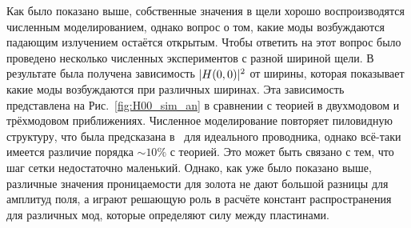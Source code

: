 Как было показано выше, собственные значения в щели хорошо воспроизводятся численным моделированием, однако вопрос о том, какие моды возбуждаются падающим излучением остаётся открытым. 
Чтобы ответить на этот вопрос было проведено несколько численных экспериментов с разной шириной щели. В результате была получена зависимость $\lvert H(0,0)\rvert^2$ от ширины, которая показывает какие моды возбуждаются при различных ширинах. Эта зависимость представлена на Рис.~\ref{fig:H00_sim_an} в сравнении с теорией в двухмодовом и трёхмодовом приближениях. Численное моделирование повторяет пиловидную структуру, что была предсказана в~\cite{Shapiro16} для идеального проводника, однако всё-таки имеется различие порядка $\sim 10\%$ с теорией. Это может быть связано с тем, что шаг сетки недостаточно маленький. Однако, как уже было показано выше, различные значения проницаемости для золота не дают большой разницы для амплитуд поля, а играют решающую роль в расчёте констант распространения для различных мод, которые определяют силу между пластинами. 
